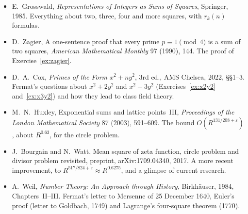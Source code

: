 \begin{itemize}
\item E.~Grosswald, \emph{Representations of Integers as Sums of Squares}, Springer, 1985. Everything about two, three, four and more squares, with $r_k(n)$ formulas.
\item D.~Zagier, A one-sentence proof that every prime $p\equiv1\pmod4$ is a sum of two squares, \emph{American Mathematical Monthly} 97 (1990), 144. The proof of Exercise~\ref{ex:zagier}.
\item D.~A.~Cox, \emph{Primes of the Form $x^2+ny^2$}, 3rd ed., AMS Chelsea, 2022, \S\S1--3. Fermat's questions about $x^2+2y^2$ and $x^2+3y^2$ (Exercises~\ref{ex:x2y2} and~\ref{ex:x3y2}) and how they lead to class field theory.
\item M.~N.~Huxley, Exponential sums and lattice points~III, \emph{Proceedings of the London Mathematical Society} 87 (2003), 591--609. The bound $O(R^{131/208+\varepsilon})$, about $R^{0.63}$, for the circle problem.
\item J.~Bourgain and N.~Watt, Mean square of zeta function, circle problem and divisor problem revisited, preprint, arXiv:1709.04340, 2017. A more recent improvement, to $R^{517/824+\varepsilon}\approx R^{0.6275}$, and a glimpse of current research.
\item A.~Weil, \emph{Number Theory: An Approach through History}, Birkh\"auser, 1984, Chapters~II--III. Fermat's letter to Mersenne of 25 December 1640, Euler's proof (letter to Goldbach, 1749) and Lagrange's four-square theorem (1770).
\end{itemize}
